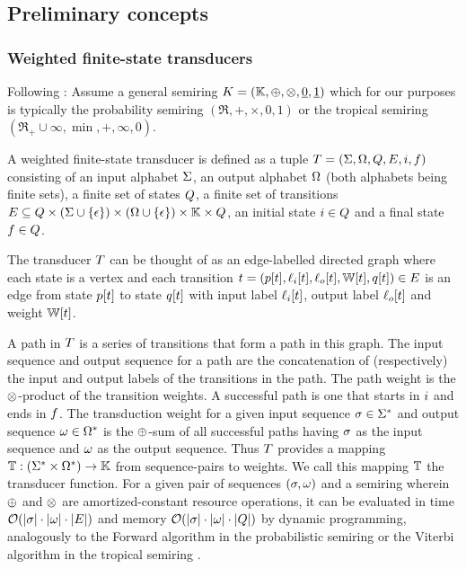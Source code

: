 \documentclass[english]{article}
\begin{document}
\subsection{Preliminary concepts}

\subsubsection{Weighted finite-state transducers}

Following \cite{MohriPereiraRiley2000}:
Assume a general semiring
$K=(\mathbb{K},\oplus,\otimes,\underline{0},\underline{1})$
which for our purposes is typically the probability semiring
$(\Re,+,\times,0,1)$
or the tropical semiring
$(\Re_{+} \cup {\infty},\min,+,\infty,0)$.

A weighted finite-state transducer is defined as a tuple
$T = (\Sigma,\Omega,Q,E,i,f)$
consisting of an input alphabet $\Sigma$,
an output alphabet $\Omega$ (both alphabets being finite sets),
a finite set of states $Q$,
a finite set of transitions
$E \subseteq Q \times (\Sigma \cup \{ \epsilon \}) \times (\Omega \cup \{ \epsilon \}) \times \mathbb{K} \times Q$,
an initial state $i \in Q$
and a final state $f \in Q$.

The transducer $T$ can be thought of as an edge-labelled directed graph
where each state is a vertex
and each transition
$t = (p[t],\ell_i[t],\ell_o[t],\mathbb{W}[t],q[t]) \in E$
is an edge from state $p[t]$ to state $q[t]$
with input label $\ell_i[t]$,
output label $\ell_o[t]$
and weight $\mathbb{W}[t]$.

A path in $T$ is a series of transitions that form a path in this graph.
The input sequence and output sequence for a path are the concatenation of (respectively)
the input and output labels of the transitions in the path.
The path weight is the $\otimes$-product of the transition weights.
A successful path is one that starts in $i$ and ends in $f$.
The transduction weight for a given input sequence $\sigma \in {\Sigma}^{\ast}$
and output sequence $\omega \in {\Omega}^{\ast}$
is the $\oplus$-sum of all successful paths
having $\sigma$ as the input sequence
and $\omega$ as the output sequence.
Thus $T$ provides a mapping
$\mathbb{T}:({\Sigma}^{\ast} \times {\Omega}^{\ast}) \to \mathbb{K}$
from sequence-pairs to weights.
We call this mapping $\mathbb{T}$ the transducer function.
For a given pair of sequences $(\sigma,\omega)$
and a semiring wherein $\oplus$ and $\otimes$ are amortized-constant resource operations,
it can be evaluated in time ${\cal O}(|\sigma| \cdot |\omega| \cdot |E|)$
and memory ${\cal O}(|\sigma| \cdot |\omega| \cdot |Q|)$
by dynamic programming,
analogously to the Forward algorithm in the probabilistic semiring
or the Viterbi algorithm in the tropical semiring
\cite{Durbin98}.
\end{document}
